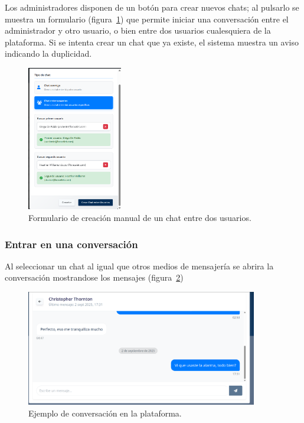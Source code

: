\documentclass[12pt, a4paper]{article}
\begin{document}
\begin{umaappendices}
Los administradores disponen de un botón para crear nuevos chats; al pulsarlo se muestra un formulario (figura~\ref{fig:chat2}) que permite iniciar una conversación entre el administrador y otro usuario, o bien entre dos usuarios cualesquiera de la plataforma. Si se intenta crear un chat que ya existe, el sistema muestra un aviso indicando la duplicidad.
\vspace{-5pt}

\begin{figure}[htbp]
	\centering
	\includegraphics[width=0.37\textwidth]{images/10_chat2.png}
	\caption[Ejemplo]{Formulario de creación manual de un chat entre dos usuarios.}
	\label{fig:chat2}
\end{figure}

	\subsubsection{Entrar en una conversación}
	Al seleccionar un chat al igual que otros medios de mensajería se abrira la conversación mostrandose los mensajes (figura~\ref{fig:chati})
	
	\begin{figure}[htbp]
		\centering
		\includegraphics[width=0.9\textwidth]{images/11_chati.png}
		\caption[Ejemplo]{Ejemplo de conversación en la plataforma.}
		\label{fig:chati}
	\end{figure}


\end{umaappendices}
\end{document}
